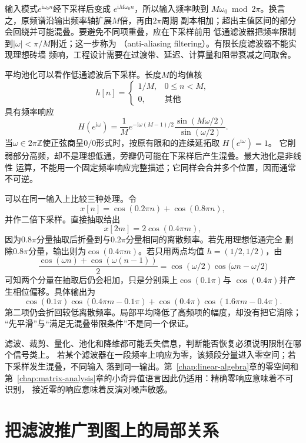 输入模式$e^{\mathrm{i}\omega_0n}$经下采样后变成
$e^{\mathrm{i}M\omega_0n}$，所以输入频率映到
$M\omega_0\bmod 2\pi$。换言之，原频谱沿输出频率轴扩展$M$倍，再由$2\pi$周期
副本相加；超出主值区间的部分会回绕并可能混叠。要避免不同项重叠，应在下采样前用
低通滤波器把频率限制到$|\omega|<\pi/M$附近；这一步称为
（anti-aliasing filtering）。有限长度滤波器不能实现理想砖墙
频响，工程设计需要在过渡带、延迟、计算量和阻带衰减之间取舍。

平均池化可以看作低通滤波后下采样。长度$M$的均值核
\[
  h[n]=
  \begin{cases}
    1/M,&0\leq n<M,\\
    0,&\text{其他}
  \end{cases}
\]
具有频率响应
\begin{equation}
  H(e^{\mathrm{i}\omega})
  =
  \frac{1}{M}
  e^{-\mathrm{i}\omega(M-1)/2}
  \frac{\sin(M\omega/2)}{\sin(\omega/2)}.
  \label{eq:signal-analysis-moving-average-response}
\end{equation}
当$\omega\in2\pi\mathbb{Z}$使正弦商呈$0/0$形式时，按原有限和的连续延拓取
$H(e^{\mathrm{i}\omega})=1$。
它削弱部分高频，却不是理想低通，旁瓣仍可能在下采样后产生混叠。最大池化是非线性
运算，不能用一个固定频率响应完整描述；它同样会合并多个位置，因而通常不可逆。

可以在同一输入上比较三种处理。令
\[
  x[n]=\cos(0.2\pi n)+\cos(0.8\pi n),
\]
并作二倍下采样。直接抽取给出
\[
  x[2m]=2\cos(0.4\pi m),
\]
因为$0.8\pi$分量抽取后折叠到与$0.2\pi$分量相同的离散频率。若先用理想低通完全
删除$0.8\pi$分量，输出则为$\cos(0.4\pi m)$。若只用两点均值
$h=(1/2,1/2)$，由
\[
  \frac{\cos(\omega n)+\cos(\omega(n-1))}{2}
  =
  \cos(\omega/2)\cos\bigl(\omega n-\omega/2\bigr)
\]
可知两个分量在抽取后仍会相加，只是分别乘上$\cos(0.1\pi)$与
$\cos(0.4\pi)$并产生相位偏移。具体输出为
\[
  \cos(0.1\pi)\cos(0.4\pi m-0.1\pi)
  +
  \cos(0.4\pi)\cos(1.6\pi m-0.4\pi).
\]
第二项仍会折回较低离散频率。局部平均降低了高频项的幅度，却没有把它消除；
“先平滑”与“满足无混叠带限条件”不是同一个保证。

滤波、裁剪、量化、池化和降维都可能丢失信息，判断能否恢复必须说明限制在哪个信号类上。
若某个滤波器在一段频率上响应为零，该频段分量进入零空间；若下采样发生混叠，不同输入
落到同一输出。第~\ref{chap:linear-algebra}章的零空间和
第~\ref{chap:matrix-analysis}章的小奇异值语言因此仍适用：精确零响应意味着不可识别，
接近零的响应意味着反演对噪声敏感。

\section{把滤波推广到图上的局部关系}
\label{sec:signal-analysis-graph-state-kernels}

